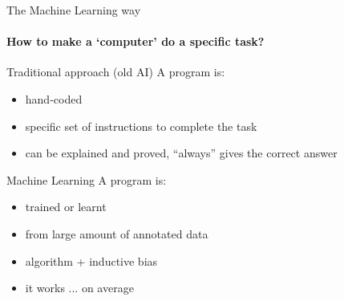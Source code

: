 \begin{frame}{The Machine Learning way}
\framesubtitle{How to make a ‘computer’ do a specific task?}
\begin{block}{Traditional approach (old AI)}
A program is:
\begin{itemize}
\item hand-coded
\item specific set of instructions to complete the task
\item can be explained and proved, ``always'' gives the correct answer
\end{itemize}
\end{block}




\begin{block}{Machine Learning}
A program is:
\begin{itemize}
\item trained or learnt 
\item from large amount of annotated data 
\item algorithm + inductive bias
\item it works ... on average
\end{itemize}
\end{block}
\end{frame}



